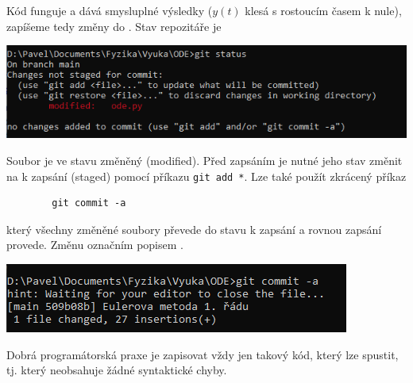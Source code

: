 \documentclass[a4paper,11pt,twoside]{article}
\def\code#1{\textnormal{\texttt{#1}}}
\theoremstyle{red}
\theoremstyle{green}
\begin{document}
    Kód funguje a dává smysluplné výsledky ($y(t)$ klesá s rostoucím časem k nule), zapíšeme tedy změny do .
    Stav repozitáře je
    \begin{center}\includegraphics[width=0.7\linewidth]{GitStatusChange.png}\end{center}
    Soubor je ve stavu změněný (modified).
    Před zapsáním je nutné jeho stav změnit na k zapsání (staged) pomocí příkazu \code{git add *}.
    Lze také použít zkrácený příkaz
    \begin{lstlisting}
        git commit -a\end{lstlisting}
    který všechny změněné soubory převede do stavu k zapsání a rovnou zapsání provede.
    Změnu označním popisem .
    \begin{center}\includegraphics[width=0.5\linewidth]{GitStatusCommit2.png}\end{center}

    {\color{blue} Dobrá programátorská praxe je zapisovat vždy jen takový kód, který lze spustit, tj. který neobsahuje žádné syntaktické chyby.}
\end{document}

